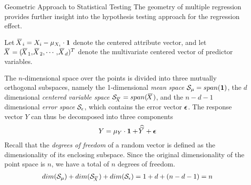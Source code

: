 %
%
\begin{frame}{Geometric Approach to Statistical Testing}
The geometry of multiple regression provides further insight into the
hypothesis testing approach for the regression effect.

\medskip

Let $\mkern 1.5mu\overline{\mkern-4.0muX}\mkern 1.5mu_i = X_i - \mu_{X_i} \cdot \mathbf{1}$ denote the centered attribute
vector, and let $\mkern 1.5mu\overline{\mkern-4.0muX}\mkern 1.5mu = (\mkern 1.5mu\overline{\mkern-4.0muX}\mkern 1.5mu_1, \mkern 1.5mu\overline{\mkern-4.0muX}\mkern 1.5mu_2, \cdots, \mkern 1.5mu\overline{\mkern-4.0muX}\mkern 1.5mu_d)^T$ denote the
multivariate centered vector of predictor variables.

\medskip

The $n$-dimensional
space over the points is divided into three mutually orthogonal 
subspaces, namely the 1-dimensional {\em mean space} 
${\mathcal S}_\mu = span(\mathbf{1})$, 
the $d$ dimensional {\em centered variable space} 
${\mathcal S}_{\mkern 1.5mu\overline{\mkern-4.0muX}\mkern 1.5mu} = span(\mkern 1.5mu\overline{\mkern-4.0muX}\mkern 1.5mu)$, and the
$n-d-1$ dimensional {\em error space} ${\mathcal S}_\epsilon$, which contains the error
vector ${\bm \epsilon}$. 
The response vector $Y$ can thus be decomposed into three components
\begin{align*}
    Y = \mu_Y \cdot \mathbf{1} + \widehat{\mkern 1.5mu\overline{\mkern-4.0muY}\mkern 1.5mu} + {\bm \epsilon}
\end{align*}
Recall that the {\em degrees of freedom}
of a random vector is defined
as the dimensionality of its enclosing subspace.
Since the original dimensionality of the point space is $n$, we have a
total of $n$ degrees of freedom. 
\begin{align*}
    dim({\mathcal S}_\mu) + dim({\mathcal S}_{\mkern 1.5mu\overline{\mkern-4.0muX}\mkern 1.5mu}) + dim({\mathcal S}_\epsilon) = 1 + d + (n-d-1) = n
\end{align*}
\end{frame}
